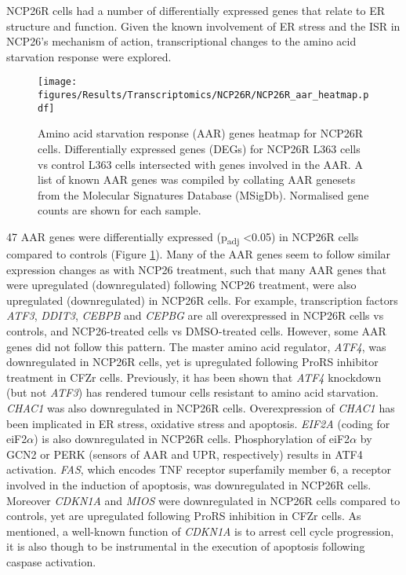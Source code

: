 NCP26R cells had a number of differentially expressed genes that relate to ER structure and function.
Given the known involvement of ER stress and the ISR in NCP26's mechanism of action, transcriptional changes to the amino acid starvation response were explored.
\begin{figure}[p]
\centering
\texttt{[image: figures/Results/Transcriptomics/NCP26R/NCP26R\_aar\_heatmap.pdf]}
\caption[Amino acid starvation response genes heatmap- NCP26R cells]{Amino acid starvation response (AAR) genes heatmap for NCP26R cells.
Differentially expressed genes (DEGs) for NCP26R L363 cells vs control L363 cells intersected with genes involved in the AAR.
A list of known AAR genes was compiled by collating AAR genesets from the Molecular Signatures Database (MSigDb).
Normalised gene counts are shown for each sample.
}
\label{fig:ncp26R_aar_heatmap}
\end{figure}
47 AAR genes were differentially expressed (p\textsubscript{adj} <0.05) in NCP26R cells compared to controls (Figure \ref{fig:ncp26R_aar_heatmap}).
Many of the AAR genes seem to follow similar expression changes as with NCP26 treatment, such that many AAR genes that were upregulated (downregulated) following NCP26 treatment, were also upregulated (downregulated) in NCP26R cells.
For example, transcription factors \textit{ATF3}, \textit{DDIT3}, \textit{CEBPB} and \textit{CEPBG} are all overexpressed in NCP26R cells vs controls, and NCP26-treated cells vs DMSO-treated cells.
However, some AAR genes did not follow this pattern.
The master amino acid regulator, \textit{ATF4}, was downregulated in NCP26R cells, yet is upregulated following ProRS inhibitor treatment in CFZr cells.
Previously, it has been shown that \textit{ATF4} knockdown (but not \textit{ATF3}) has rendered tumour cells resistant to amino acid starvation\cite{cheng2018arginine}.
\textit{CHAC1} was also downregulated in NCP26R cells.
Overexpression of \textit{CHAC1} has been implicated in ER stress, oxidative stress and apoptosis\cite{crawford2015human}.
\textit{EIF2A} (coding for eiF2$\alpha$) is also downregulated in NCP26R cells.
Phosphorylation of eiF2$\alpha$ by GCN2 or PERK (sensors of AAR and UPR, respectively) results in ATF4 activation.
\textit{FAS}, which encodes TNF receptor superfamily member 6, a receptor involved in the induction of apoptosis, was downregulated in NCP26R cells.
Moreover \textit{CDKN1A} and \textit{MIOS} were downregulated in NCP26R cells compared to controls, yet are upregulated following ProRS inhibition in CFZr cells.
As mentioned, a well-known function of \textit{CDKN1A} is to arrest cell cycle progression, it is also though to be instrumental in the execution of apoptosis following caspase activation.

